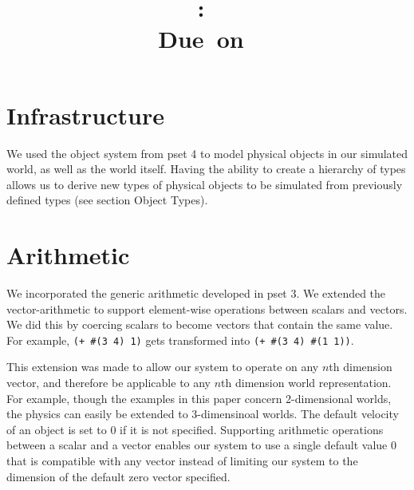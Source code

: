 \documentclass{article}
\title{
    \textmd{\hmwkClass:\ \hmwkTitle}\\
    \small{Due\ on\ \hmwkDueDate}
}
\author{\hmwkAuthorName}
\date{}
\begin{document}
\maketitle


\section{Infrastructure}
We used the object system from pset 4 to model physical objects in our simulated world, as well as the world itself. Having the ability to create a hierarchy of types allows us to derive new types of physical objects to be simulated from previously defined types (see section Object Types).




\section{Arithmetic}

We incorporated the generic arithmetic developed in pset 3. We extended the
vector-arithmetic to support element-wise operations between scalars and
vectors. We did this by coercing scalars to become vectors that contain the
same value. For example, \texttt{(+ \#(3 4) 1)} gets transformed into
\texttt{(+ \#(3 4) \#(1 1))}. 

This extension was made to allow our system to operate on any $n$th dimension
vector, and therefore be applicable to any $n$th dimension world
representation. For example, though the examples in this paper concern 2-dimensional worlds, the physics can easily be extended to 3-dimensinoal worlds. The default velocity of an object is set to 0 if it is not
specified. Supporting arithmetic operations between a scalar and a vector
enables our system to use a single default value 0 that is compatible with any
vector instead of limiting our system to the dimension of the default zero
vector specified.  
\end{document}
